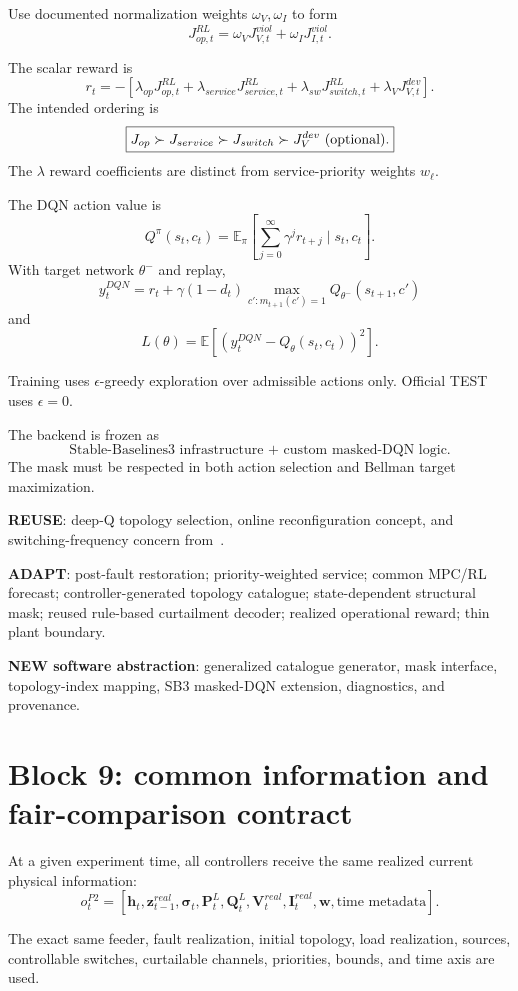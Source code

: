 \documentclass[11pt]{article}
\begin{document}
Use documented normalization weights $\omega_V,\omega_I$ to form
\[
J_{op,t}^{RL}=\omega_VJ_{V,t}^{viol}+\omega_IJ_{I,t}^{viol}.
\]

The scalar reward is
\[
\boxed{
r_t=
-\left[
\lambda_{op}J_{op,t}^{RL}
+\lambda_{service}J_{service,t}^{RL}
+\lambda_{sw}J_{switch,t}^{RL}
+\lambda_VJ_{V,t}^{dev}
\right].}
\]
The intended ordering is
\[
\boxed{
J_{op}\succ J_{service}\succ J_{switch}\succ J_V^{dev}\ {\rm(optional)}.}
\]
The $\lambda$ reward coefficients are distinct from service-priority weights $w_\ell$.

The DQN action value is
\[
Q^\pi(s_t,c_t)
=
\mathbb E_\pi\left[
\sum_{j=0}^{\infty}\gamma^jr_{t+j}
\mid s_t,c_t
\right].
\]
With target network $\theta^-$ and replay,
\[
\boxed{
y_t^{DQN}
=
r_t+\gamma(1-d_t)
\max_{c':m_{t+1}(c')=1}Q_{\theta^-}(s_{t+1},c')}
\]
and
\[
\boxed{
L(\theta)
=
\mathbb E[(y_t^{DQN}-Q_\theta(s_t,c_t))^2].}
\]

Training uses $\epsilon$-greedy exploration over admissible actions only. Official TEST
uses $\epsilon=0$.

The backend is frozen as
\[
\boxed{\text{Stable-Baselines3 infrastructure + custom masked-DQN logic}.}
\]
The mask must be respected in both action selection and Bellman target maximization.

\textbf{REUSE}: deep-Q topology selection, online reconfiguration concept, and
switching-frequency concern from~\cite{Oh2020}.

\textbf{ADAPT}: post-fault restoration; priority-weighted service; common MPC/RL
forecast; controller-generated topology catalogue; state-dependent structural mask;
reused rule-based curtailment decoder; realized operational reward; thin plant boundary.

\textbf{NEW software abstraction}: generalized catalogue generator, mask interface,
topology-index mapping, SB3 masked-DQN extension, diagnostics, and provenance.

\section{Block 9: common information and fair-comparison contract}
At a given experiment time, all controllers receive the same realized current physical
information:
\[
o_t^{P2}
=
[
\mathbf h_t,
\mathbf z_{t-1}^{real},
\boldsymbol\sigma_t,
\mathbf P_t^L,
\mathbf Q_t^L,
\mathbf V_t^{real},
\mathbf I_t^{real},
\mathbf w,
\text{time metadata}
].
\]

The exact same feeder, fault realization, initial topology, load realization, sources,
controllable switches, curtailable channels, priorities, bounds, and time axis are used.
\end{document}
